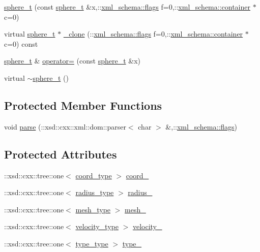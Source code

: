 \begin{DoxyCompactItemize}
\item 
\hyperlink{classsphere__t_a7a07c901e904b7662c37e609e6a505d2}{sphere\+\_\+t} (const \hyperlink{classsphere__t}{sphere\+\_\+t} \&x,\+::\hyperlink{namespacexml__schema_a0612287d030cb2732d31a45b258fdc87}{xml\+\_\+schema\+::flags} f=0,\+::\hyperlink{namespacexml__schema_ada9aa30dc722e93ee2ed7243085402a5}{xml\+\_\+schema\+::container} $\ast$c=0)
\item 
virtual \hyperlink{classsphere__t}{sphere\+\_\+t} $\ast$ \hyperlink{classsphere__t_af9cd6acbc366d507146512038a054d3f}{\+\_\+clone} (\+::\hyperlink{namespacexml__schema_a0612287d030cb2732d31a45b258fdc87}{xml\+\_\+schema\+::flags} f=0,\+::\hyperlink{namespacexml__schema_ada9aa30dc722e93ee2ed7243085402a5}{xml\+\_\+schema\+::container} $\ast$c=0) const 
\item 
\hyperlink{classsphere__t}{sphere\+\_\+t} \& \hyperlink{classsphere__t_ab3394ed9ade57ffa5541c8e5f86d48c3}{operator=} (const \hyperlink{classsphere__t}{sphere\+\_\+t} \&x)
\item 
virtual \hyperlink{classsphere__t_a857c5c67e4649983f9d3228131262d0e}{$\sim$sphere\+\_\+t} ()
\end{DoxyCompactItemize}
\subsection*{Protected Member Functions}
\begin{DoxyCompactItemize}
\item 
void \hyperlink{classsphere__t_a8a9b83d8906f45ca3ee33b11e54543b5}{parse} (\+::xsd\+::cxx\+::xml\+::dom\+::parser$<$ char $>$ \&,\+::\hyperlink{namespacexml__schema_a0612287d030cb2732d31a45b258fdc87}{xml\+\_\+schema\+::flags})
\end{DoxyCompactItemize}
\subsection*{Protected Attributes}
\begin{DoxyCompactItemize}
\item 
\+::xsd\+::cxx\+::tree\+::one$<$ \hyperlink{classsphere__t_a60b541b054e6695017e6468b51a89efd}{coord\+\_\+type} $>$ \hyperlink{classsphere__t_ac1893e748ca7e9ff0a9d19fd84b7d936}{coord\+\_\+}
\item 
\+::xsd\+::cxx\+::tree\+::one$<$ \hyperlink{classsphere__t_a7d5046bdba409d8f49e7c9902ae56278}{radius\+\_\+type} $>$ \hyperlink{classsphere__t_aa162b171f3b45de2aea1436edec60d6a}{radius\+\_\+}
\item 
\+::xsd\+::cxx\+::tree\+::one$<$ \hyperlink{classsphere__t_af7cb7f854954b484b72bbed0516e223a}{mesh\+\_\+type} $>$ \hyperlink{classsphere__t_aa8d9660400db3142a7c2ee5f4549eaa1}{mesh\+\_\+}
\item 
\+::xsd\+::cxx\+::tree\+::one$<$ \hyperlink{classsphere__t_ad38aced876188b1732a5c050670f8cff}{velocity\+\_\+type} $>$ \hyperlink{classsphere__t_ac028ed4884b4438876e24e343029de88}{velocity\+\_\+}
\item 
\+::xsd\+::cxx\+::tree\+::one$<$ \hyperlink{classsphere__t_a458644a173b4fcac645ccb6e0dd1605f}{type\+\_\+type} $>$ \hyperlink{classsphere__t_acfb1c03f858e282c0a91a5f859c2ac63}{type\+\_\+}
\end{DoxyCompactItemize}


